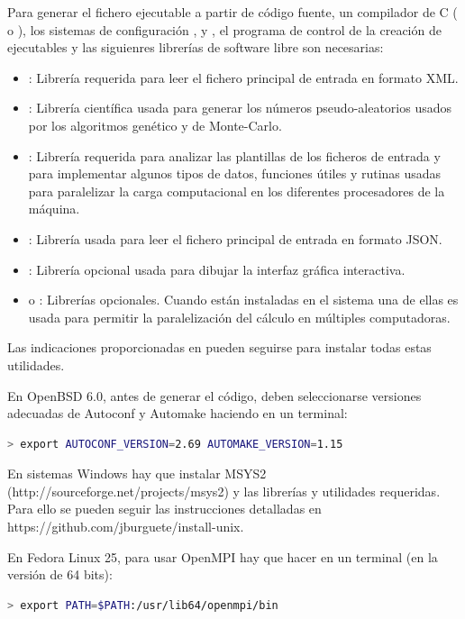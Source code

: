 \documentclass[a4paper]{report}
\begin{document}
Para generar el fichero ejecutable a partir de código fuente, un compilador de C
(\citet{gcc} o \citet{clang}), los sistemas de configuración \citet{autoconf},
\citet{automake} y \citet{pkgconfig}, el programa de control de la creación de
ejecutables \citet{gnumake} y las siguienres librerías de software libre son
necesarias:
\begin{itemize}
\item\citet{libxml}: Librería requerida para leer el fichero principal de
entrada en formato XML.
\item\citet{gsl}: Librería científica usada para generar los números
pseudo-aleatorios usados por los algoritmos genético y de Monte-Carlo.
\item\citet{glib}: Librería requerida para analizar las plantillas de los
ficheros de entrada y para implementar algunos tipos de datos, funciones útiles
y rutinas usadas para paralelizar la carga computacional en los diferentes
procesadores de la máquina.
\item\citet{json-glib}: Librería usada para leer el fichero principal de entrada
en formato JSON.
\item\citet{gtk}: Librería opcional usada para dibujar la interfaz gráfica
interactiva.
\item\citet{openmpi} o \citet{mpich}: Librerías opcionales. Cuando están
instaladas en el sistema una de ellas es usada para permitir la paralelización
del cálculo en múltiples computadoras.
\end{itemize}
Las indicaciones proporcionadas en \citet{install-unix} pueden seguirse para
instalar todas estas utilidades.

En OpenBSD 6.0, antes de generar el código, deben seleccionarse versiones
adecuadas de Autoconf y Automake haciendo en un terminal:
\begin{lstlisting}[language=bash,basicstyle=\scriptsize]
> export AUTOCONF_VERSION=2.69 AUTOMAKE_VERSION=1.15
\end{lstlisting}

En sistemas Windows hay que instalar MSYS2
(http://sourceforge.net/projects/msys2) y las librerías y utilidades requeridas.
Para ello se pueden seguir las instrucciones detalladas en
https://github.com/jburguete/install-unix.

En Fedora Linux 25, para usar OpenMPI hay que hacer en un terminal (en la
versión de 64 bits):
\begin{lstlisting}[language=bash,basicstyle=\scriptsize]
> export PATH=$PATH:/usr/lib64/openmpi/bin
\end{lstlisting}
\end{document}

